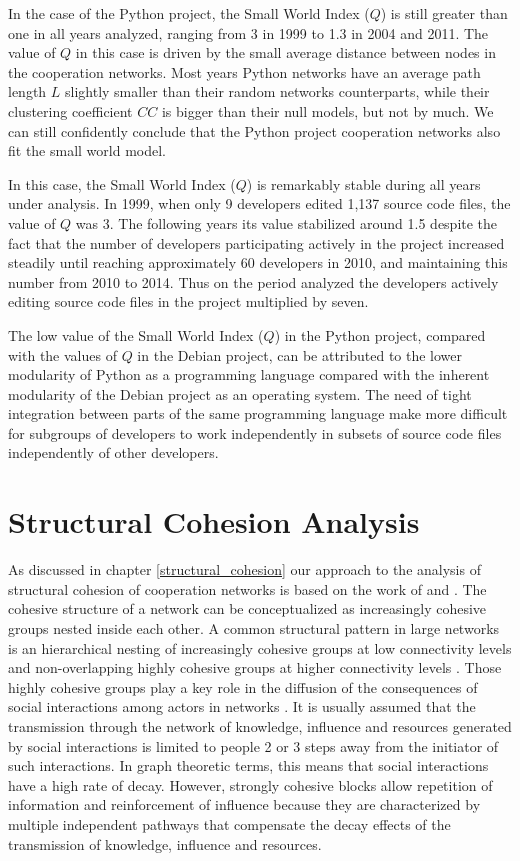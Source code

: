 

In the case of the Python project, the Small World Index ($Q$) is still greater than one in all years analyzed, ranging from 3 in 1999 to 1.3 in 2004 and 2011. The value of $Q$ in this case is driven by the small average distance between nodes in the cooperation networks. Most years Python networks have an average path length $L$ slightly smaller than their random networks counterparts, while their clustering coefficient $CC$ is bigger than their null models, but not by much. We can still confidently conclude that the Python project cooperation networks also fit the small world model.

In this case, the Small World Index ($Q$) is remarkably stable during all years under analysis. In 1999, when only 9 developers edited 1,137 source code files, the value of $Q$ was 3. The following years its value stabilized around 1.5 despite the fact that the number of developers participating actively in the project increased steadily until reaching approximately 60 developers in 2010, and maintaining this number from 2010 to 2014. Thus on the period analyzed the developers actively editing source code files in the project multiplied by seven.

The low value of the Small World Index ($Q$) in the Python project, compared with the values of $Q$ in the Debian project, can be attributed to the lower modularity of Python as a programming language compared with the inherent modularity of the Debian project as an operating system. The need of tight integration between parts of the same programming language make more difficult for subgroups of developers to work independently in subsets of source code files independently of other developers. 

\section{Structural Cohesion Analysis}

As discussed in chapter \ref{structural_cohesion} our approach to the analysis of structural cohesion of cooperation networks is based on the work of \citet{white:2001} and \citet{moody:2003}. The cohesive structure of a network can be conceptualized as increasingly cohesive groups nested inside each other. A common structural pattern in large networks is an hierarchical nesting of increasingly cohesive groups at low connectivity levels and non-overlapping highly cohesive groups at higher connectivity levels \citep[112]{moody:2003}. Those highly cohesive groups play a key role in the diffusion of the consequences of social interactions among actors in networks \citep[355-356]{white:2001}. It is usually assumed that the transmission through the network of knowledge, influence and resources generated by social interactions is limited to people 2 or 3 steps away from the initiator of such interactions. In graph theoretic terms, this means that social interactions have a high rate of decay. However, strongly cohesive blocks allow repetition of information and reinforcement of influence because they are characterized by multiple independent pathways that compensate the decay effects of the transmission of knowledge, influence and resources.

